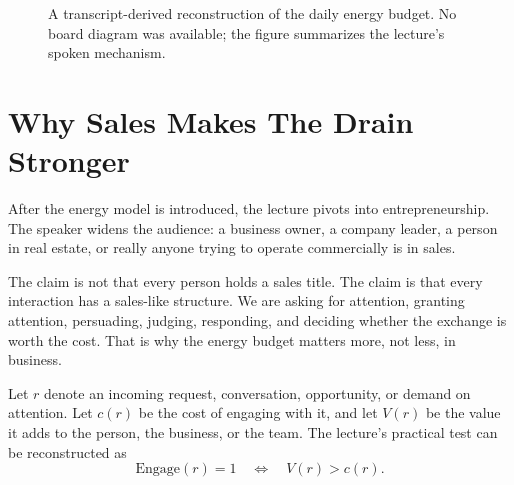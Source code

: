 \begin{figure}
\centering
{}
\caption{A transcript-derived reconstruction of the daily energy budget. No board diagram was available; the figure summarizes the lecture's spoken mechanism.}
\end{figure}

\section{Why Sales Makes The Drain Stronger}

After the energy model is introduced, the lecture pivots into entrepreneurship. The speaker widens the audience: a business owner, a company leader, a person in real estate, or really anyone trying to operate commercially is in sales.

The claim is not that every person holds a sales title. The claim is that every interaction has a sales-like structure. We are asking for attention, granting attention, persuading, judging, responding, and deciding whether the exchange is worth the cost. That is why the energy budget matters more, not less, in business.

Let \(r\) denote an incoming request, conversation, opportunity, or demand on attention. Let \(c(r)\) be the cost of engaging with it, and let \(V(r)\) be the value it adds to the person, the business, or the team. The lecture's practical test can be reconstructed as
\begin{equation}
\mathrm{Engage}(r)=1
\quad \Longleftrightarrow \quad
V(r) > c(r).
\end{equation}

